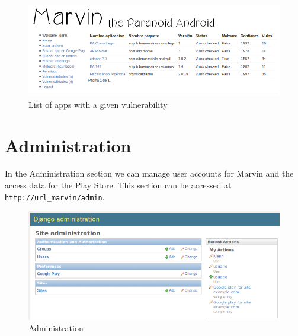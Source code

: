 \documentclass[11pt]{article}
\begin{document}
\begin{figure}[H]
\begin{center}
\includegraphics[width=\textwidth]{graphics/marvin_vulns2.png}
\caption{List of apps with a given vulnerability} \label{vulns2}
\end{center}
\end{figure}

\section{Administration}
In the Administration section we can manage user accounts for Marvin and the access data for the Play Store. This section can be accessed at \texttt{http://url\_marvin/admin}.

\begin{figure}[H]
\begin{center}
\includegraphics[width=\textwidth]{graphics/marvin1.png}
\caption{Administration} \label{admin}
\end{center}
\end{figure}
\end{document}
